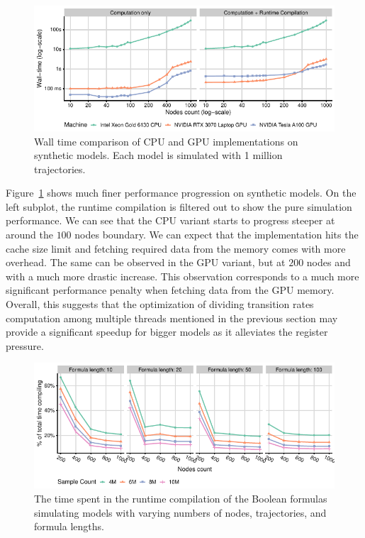 \documentclass[times, twoside]{zHenriquesLab-StyleBioRxiv}
\begin{document}
\begin{figure}
    \centering
    \includegraphics[width=\linewidth]{Figures/nodes.pdf}
    \caption{Wall time comparison of CPU and GPU implementations on synthetic models. Each model is simulated with 1 million trajectories.}
    \label{fig:synth}
\end{figure}

Figure~\ref{fig:synth} shows much finer performance progression on synthetic models. On the left subplot, the runtime compilation is filtered out to show the pure simulation performance. We can see that the CPU variant starts to progress steeper at around the $100$ nodes boundary. We can expect that the implementation hits the cache size limit and fetching required data from the memory comes with more overhead. The same can be observed in the GPU variant, but at $200$ nodes and with a much more drastic increase. This observation corresponds to a much more significant performance penalty when fetching data from the GPU memory. Overall, this suggests that the optimization of dividing transition rates computation among multiple threads mentioned in the previous section may provide a significant speedup for bigger models as it alleviates the register pressure.

\begin{figure}
    \centering
    \includegraphics[width=\linewidth]{Figures/nodes-compilation-big-NVIDIA Tesla A100 GPU.pdf}
    \caption{The time spent in the runtime compilation of the Boolean formulas simulating models with varying numbers of nodes, trajectories, and formula lengths.}
    \label{fig:comp}
\end{figure}
\end{document}
